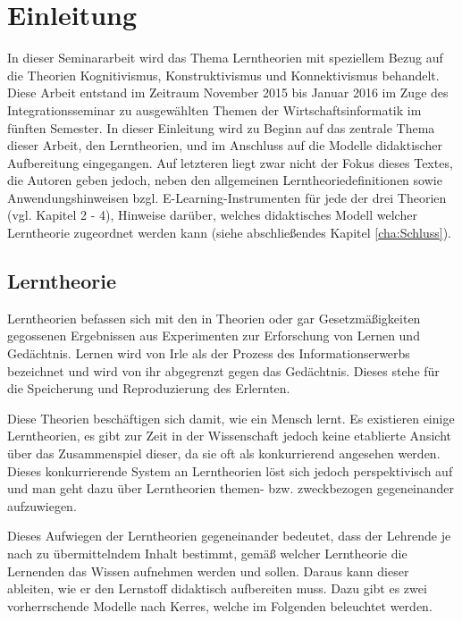 \chapter{Einleitung}
\label{cha:Einleitung}
In dieser Seminararbeit wird das Thema Lerntheorien mit speziellem Bezug auf die Theorien Kognitivismus, Konstruktivismus und Konnektivismus behandelt. Diese Arbeit entstand im Zeitraum November 2015 bis Januar 2016 im Zuge des Integrationsseminar zu ausgewählten Themen der Wirtschaftsinformatik im fünften Semester. In dieser Einleitung wird zu Beginn auf das zentrale Thema dieser Arbeit, den Lerntheorien, und im Anschluss auf die Modelle didaktischer Aufbereitung eingegangen. Auf letzteren liegt zwar nicht der Fokus dieses Textes, die Autoren geben jedoch, neben den allgemeinen Lerntheoriedefinitionen sowie Anwendungshinweisen bzgl. E-Learning-Instrumenten für jede der drei Theorien (vgl. Kapitel 2 - 4), Hinweise darüber, welches didaktisches Modell welcher Lerntheorie zugeordnet werden kann (siehe abschließendes Kapitel \ref{cha:Schluss}). 

\section{Lerntheorie}
\label{sec:Lerntheorie}
Lerntheorien befassen sich mit den in Theorien oder gar Gesetzmäßigkeiten gegossenen Ergebnissen aus Experimenten zur Erforschung von Lernen und Gedächtnis. Lernen wird von Irle als der Prozess des Informationserwerbs bezeichnet und wird von ihr abgegrenzt gegen das Gedächtnis. Dieses stehe für die Speicherung und Reproduzierung des Erlernten. \cite{Irle.1986} %

Diese Theorien beschäftigen sich damit, wie ein Mensch lernt. \cite{Reinmann.2013} Es existieren einige Lerntheorien, es gibt zur Zeit in der Wissenschaft jedoch keine etablierte Ansicht über das Zusammenspiel dieser, da sie oft als konkurrierend angesehen werden. \cite[S. 172 f.]{Weinert.1996} Dieses konkurrierende System an Lerntheorien löst sich jedoch perspektivisch auf \cite{WittKerres.2002} und man geht dazu über Lerntheorien themen- bzw. zweckbezogen gegeneinander aufzuwiegen. \cite{Reinmann.2013} %

Dieses Aufwiegen der Lerntheorien gegeneinander bedeutet, dass der Lehrende je nach zu übermittelndem Inhalt bestimmt, gemäß welcher Lerntheorie die Lernenden das Wissen aufnehmen werden und sollen. Daraus kann dieser ableiten, wie er den Lernstoff didaktisch aufbereiten muss. Dazu gibt es zwei vorherrschende Modelle nach Kerres, welche im Folgenden beleuchtet werden. 

